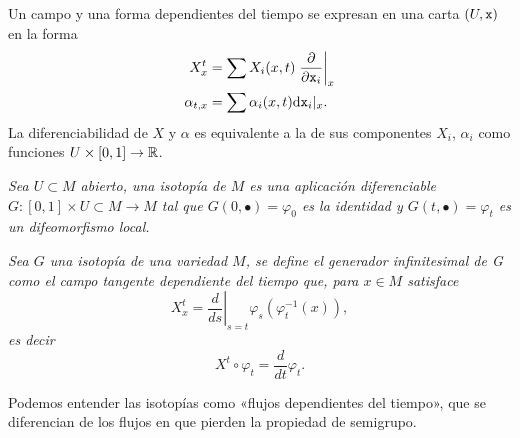   \begin{obs}
    Un campo y una forma dependientes del tiempo se expresan en una carta $(U,\mathtt{x})$ en la forma
    \begin{align*}
      X^t_x &= \sum X_i(x,t) \left.\frac{\partial}{\partial \mathtt{x}_i}\right|_x \\
      \alpha_{t,x} &= \sum \alpha_i(x,t) \mathrm{d} \mathtt{x}_i |_x.
    \end{align*}
    La diferenciabilidad de $X$ y $\alpha$ es equivalente a la de sus componentes $X_i$, $\alpha_i$ como funciones $U\times[0,1] \rightarrow \mathbb{R}$.
  \end{obs}
  \begin{defn}
    \em
    Sea $U\subset M$ abierto, una \emph{isotopía} de $M$ es una aplicación diferenciable
	$G: [0,1] \times U\subset M \rightarrow M$
	tal que $G(0,\bullet)=\varphi_0$ es la identidad y $G(t,\bullet)=\varphi_t$ es un difeomorfismo local. 
  \end{defn}
  \begin{defn}
    \em
    Sea $G$ una isotopía de una variedad $M$, se define el \emph{generador infinitesimal de G} como el campo tangente dependiente del tiempo que, para $x\in M$ satisface
    \begin{equation*}
      X^t_x=\left.\frac{d}{ds}\right|_{s=t}\varphi_s(\varphi_t^{-1}(x)),
    \end{equation*}
    es decir
    \begin{equation*}
      X^t\circ \varphi_t = \frac{d}{dt} \varphi_t. 
    \end{equation*}
  \end{defn}

  \begin{obs}
    Podemos entender las isotopías como «flujos dependientes del tiempo», que se diferencian de los flujos en que pierden la propiedad de semigrupo.
  \end{obs}


